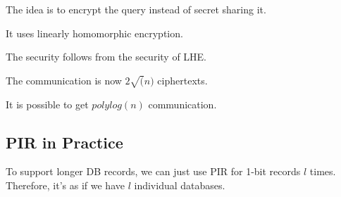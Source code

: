 \documentclass{article}
\theoremstyle{definition}
\begin{document}
The idea is to encrypt the query instead of secret sharing it.

It uses linearly homomorphic encryption.

The security follows from the security of LHE.

The communication is now $2\sqrt(n)$ ciphertexts.

It is possible to get $polylog(n)$ communication.

\subsection{PIR in Practice}

To support longer DB records, we can just use PIR for 1-bit records $l$ times. Therefore,
it's as if we have $l$ individual databases.



\newpage
\end{document}
